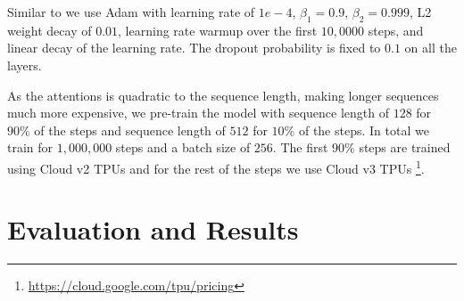 \documentclass[10pt, a4paper]{article}
\begin{document}
Similar to \cite{devlin2019bert} we use Adam with learning rate of $1e-4$, $\beta_1=0.9$, $\beta_2=0.999$, L2 weight decay of $0.01$, learning rate warmup over the first $10,0000$ steps, and linear decay of the learning rate. The dropout probability is fixed to $0.1$ on all the layers.

As the attentions is quadratic to the sequence length, making longer sequences much more expensive, we pre-train the model with sequence length of $128$ for $90\%$ of the steps and sequence length of $512$ for $10\%$ of the steps. In total we train for $1,000,000$ steps and a batch size of $256$. The first $90\%$ steps are trained using Cloud v2 TPUs and for the rest of the steps we use Cloud v3 TPUs \footnote{\scriptsize{\url{https://cloud.google.com/tpu/pricing}}}.


\section{Evaluation and Results}\label{sec:eval-results}



\end{document}
